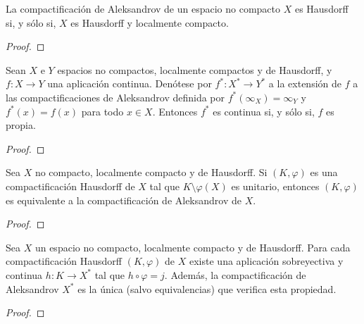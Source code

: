 \begin{proposición}
    La compactificación de Aleksandrov de un espacio no compacto $X$ es Hausdorff si, y sólo si, $X$ es Hausdorff y localmente compacto.
\end{proposición}
\begin{proof}
\end{proof}
\begin{proposición}
    Sean $X$ e $Y$ espacios no compactos, localmente compactos y de Hausdorff, y $f: X \to Y$ una aplicación continua. Denótese por $f^*: X^* \to Y^*$ a la extensión de $f$ a las compactificaciones de Aleksandrov definida por $f^*(\infty_X) = \infty_Y$ y $f^*(x) = f(x)$ para todo $x \in X$. Entonces $f^*$ es continua si, y sólo si, $f$ es propia.
\end{proposición}
\begin{proof}
\end{proof}
\begin{proposición}
    Sea $X$ no compacto, localmente compacto y de Hausdorff. Si $(K, \varphi)$ es una compactificación Hausdorff de $X$ tal que $K \setminus \varphi(X)$ es unitario, entonces $(K, \varphi)$ es equivalente a la compactificación de Aleksandrov de $X$.
\end{proposición}
\begin{proof}
\end{proof}
\begin{proposición}
    Sea $X$ un espacio no compacto, localmente compacto y de Hausdorff. Para cada compactificación Hausdorff $(K, \varphi)$ de $X$ existe una aplicación sobreyectiva y continua $h: K \to X^*$ tal que $h \circ \varphi = j$. Además, la compactificación de Aleksandrov $X^*$ es la única (salvo equivalencias) que verifica esta propiedad.
\end{proposición}
\begin{proof}
\end{proof}
